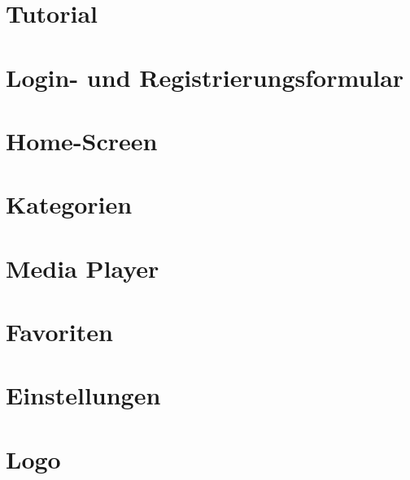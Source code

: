 \section{Tutorial}


\section{Login- und Registrierungsformular}


\section{Home-Screen}


\section{Kategorien}


\section{Media Player}


\section{Favoriten}


\section{Einstellungen}


\section{Logo}

